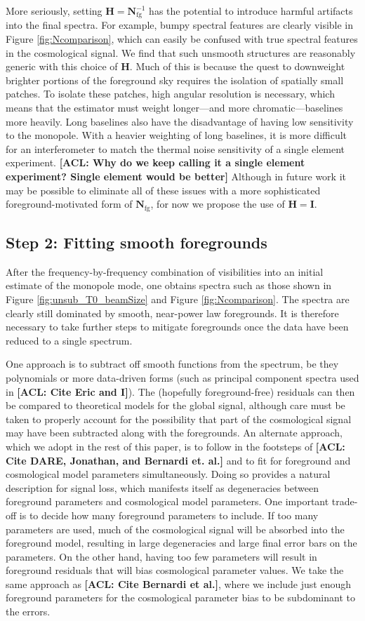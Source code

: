 \documentclass[twolcolumn,apj,iop,numberedappendix]{emulateapj}
\newcommand{\Hmat}{\mathbf{H}}
\newcommand{\Nfg}{\mathbf{N}_{\textrm{fg}}}
\newcommand{\acl}[1]{{\color{red} \textbf{[ACL:  #1]}}}
\begin{document}
More seriously, setting $\Hmat = \Nfg^{-1}$ has the potential to introduce harmful artifacts into the final spectra. For example, bumpy spectral features are clearly visible in Figure \ref{fig:Ncomparison}, which can easily be confused with true spectral features in the cosmological signal. We find that such unsmooth structures are reasonably generic with this choice of $\Hmat$. Much of this is because the quest to downweight brighter portions of the foreground sky requires the isolation of spatially small patches. To isolate these patches, high angular resolution is necessary, which means that the estimator must weight longer---and more chromatic---baselines more heavily. Long baselines also have the disadvantage of having low sensitivity to the monopole. With a heavier weighting of long baselines, it is more difficult for an interferometer to match the thermal noise sensitivity of a single element experiment. \acl{Why do we keep calling it a single element experiment? Single element would be better} Although in future work it may be possible to eliminate all of these issues with a more sophisticated foreground-motivated form of $\Nfg$, for now we propose the use of $\Hmat = \mathbf{I}$.

\subsection{Step 2: Fitting smooth foregrounds}
\label{sec:fitting}
After the frequency-by-frequency combination of visibilities into an initial estimate of the monopole mode, one obtains spectra such as those shown in Figure \ref{fig:unsub_T0_beamSize} and Figure \ref{fig:Ncomparison}. The spectra are clearly still dominated by smooth, near-power law foregrounds. It is therefore necessary to take further steps to mitigate foregrounds once the data have been reduced to a single spectrum.

One approach is to subtract off smooth functions from the spectrum, be they polynomials or more data-driven forms (such as principal component spectra used in \acl{Cite Eric and I}). The (hopefully foreground-free) residuals can then be compared to theoretical models for the global signal, although care must be taken to properly account for the possibility that part of the cosmological signal may have been subtracted along with the foregrounds. An alternate approach, which we adopt in the rest of this paper, is to follow in the footsteps of \acl{Cite DARE, Jonathan, and Bernardi et. al.} and to fit for foreground and cosmological model parameters simultaneously. Doing so provides a natural description for signal loss, which manifests itself as degeneracies between foreground parameters and cosmological model parameters. One important trade-off is to decide how many foreground parameters to include. If too many parameters are used, much of the cosmological signal will be absorbed into the foreground model, resulting in large degeneracies and large final error bars on the parameters. On the other hand, having too few parameters will result in foreground residuals that will bias cosmological parameter values. We take the same approach as \acl{Cite Bernardi et al.}, where we include just enough foreground parameters for the cosmological parameter bias to be subdominant to the errors.
\end{document}
